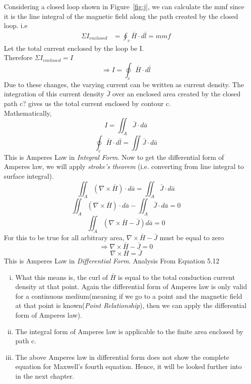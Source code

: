 Considering a closed loop shown in Figure~\ref{fig:j}, we can calculate the mmf since it is the line integral of the magnetic field along the path created by the closed loop. i.e
\begin{align*}
\Sigma I_{enclosed} &= \oint_c\bar{H}\cdot d\bar{l} = mmf
\end{align*}
Let the total current enclosed by the loop be I.\\
Therefore $\Sigma I_{enclosed} = I$
\begin{equation*}
\Rightarrow I = \oint_c\bar{H}\cdot d\bar{l}
\end{equation*}
Due to these changes, the varying current can be written as current density. The integration of this current density $\bar{J}$ over an enclosed area created by the closed path c? gives us the total current enclosed by contour c.\\
Mathematically,
\begin{equation*}
I = \iint_A\bar{J} \cdot d\bar{a}
\end{equation*}
\begin{equation}
\boxed{\oint_c\bar{H} \cdot d\bar{l} = \iint\bar{J} \cdot d\bar{a}}
\end{equation}
This is Amperes Law in \emph{Integral Form}. Now to get the differential form of Amperes law, we will apply \emph{stroke's theorem} (i.e. converting from line integral to surface integral).
\begin{equation*}
\iint_A(\nabla \times \bar{H}) \cdot d\bar{a} = \iint_A\bar{J} \cdot d\bar{a}
\end{equation*}
\begin{equation*}
\iint_A(\nabla \times \bar{H}) \cdot d\bar{a} - \iint_A\bar{J} \cdot d\bar{a} = 0
\end{equation*}
\begin{equation*}
\iint_A(\nabla \times \bar{H} - \bar{J})d\bar{a} = 0
\end{equation*} 
For this to be true for all arbitrary area, $\nabla \times \bar{H} - \bar{J}$ must be equal to zero
\begin{equation*}
\Rightarrow \nabla \times \bar{H} - \bar{J} = 0
\end{equation*}
\begin{equation}
\boxed{\nabla \times \bar{H} = \bar{J}}
\end{equation}
This is Amperes Law in \emph{Differential Form}. Analysis From Equation 5.12
\begin{enumerate}[(i)]
\item What this means is, the curl of $\bar{H}$ is equal to the total conduction current density at that point. Again the differential form of Amperes law is only valid for a continuous medium(meaning if we go to a point and the magnetic field at that point is known(\emph{Point Relationship}), then we can apply the differential form of Amperes law).
\item The integral form of Amperes law is applicable to the finite area enclosed by path c.
\item The above Amperes law in differential form does not show the complete equation for Maxwell's fourth equation. Hence, it will be looked further into in the next chapter.
\end{enumerate}
